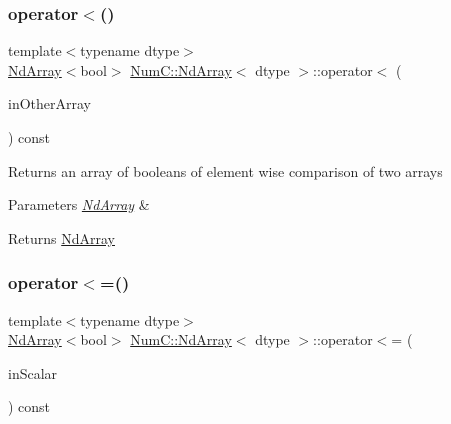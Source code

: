 \subsubsection{\texorpdfstring{operator$<$()}{operator<()}\hspace{0.1cm}{\footnotesize\ttfamily [2/2]}}
{\footnotesize\ttfamily template$<$typename dtype$>$ \\
\mbox{\hyperlink{class_num_c_1_1_nd_array}{Nd\+Array}}$<$bool$>$ \mbox{\hyperlink{class_num_c_1_1_nd_array}{Num\+C\+::\+Nd\+Array}}$<$ dtype $>$\+::operator$<$ (\begin{DoxyParamCaption}\item[{const \mbox{\hyperlink{class_num_c_1_1_nd_array}{Nd\+Array}}$<$ dtype $>$ \&}]{in\+Other\+Array }\end{DoxyParamCaption}) const\hspace{0.3cm}{\ttfamily [inline]}}

Returns an array of booleans of element wise comparison of two arrays


\begin{DoxyParams}{Parameters}
{\em \mbox{\hyperlink{class_num_c_1_1_nd_array}{Nd\+Array}}} & \\
\hline
\end{DoxyParams}
\begin{DoxyReturn}{Returns}
\mbox{\hyperlink{class_num_c_1_1_nd_array}{Nd\+Array}} 
\end{DoxyReturn}
\mbox{\label{class_num_c_1_1_nd_array_a6ca5d2e5f0365adf35747b26fd4a892f}} 
\subsubsection{\texorpdfstring{operator$<$=()}{operator<=()}\hspace{0.1cm}{\footnotesize\ttfamily [1/2]}}
{\footnotesize\ttfamily template$<$typename dtype$>$ \\
\mbox{\hyperlink{class_num_c_1_1_nd_array}{Nd\+Array}}$<$bool$>$ \mbox{\hyperlink{class_num_c_1_1_nd_array}{Num\+C\+::\+Nd\+Array}}$<$ dtype $>$\+::operator$<$= (\begin{DoxyParamCaption}\item[{dtype}]{in\+Scalar }\end{DoxyParamCaption}) const\hspace{0.3cm}{\ttfamily [inline]}}

